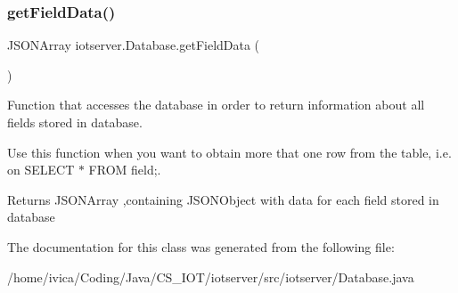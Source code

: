 \subsubsection{\texorpdfstring{get\+Field\+Data()}{getFieldData()}\hspace{0.1cm}{\footnotesize\ttfamily [3/3]}}
{\footnotesize\ttfamily J\+S\+O\+N\+Array iotserver.\+Database.\+get\+Field\+Data (\begin{DoxyParamCaption}{ }\end{DoxyParamCaption})\hspace{0.3cm}{\ttfamily [inline]}}

Function that accesses the database in order to return information about all fields stored in database.

Use this function when you want to obtain more that one row from the table, i.\+e. on S\+E\+L\+E\+CT $\ast$ F\+R\+OM field;.

\begin{DoxyReturn}{Returns}
J\+S\+O\+N\+Array ,containing J\+S\+O\+N\+Object with data for each field stored in database 
\end{DoxyReturn}


The documentation for this class was generated from the following file\+:\begin{DoxyCompactItemize}
\item 
/home/ivica/\+Coding/\+Java/\+C\+S\+\_\+\+I\+O\+T/iotserver/src/iotserver/Database.\+java\end{DoxyCompactItemize}
